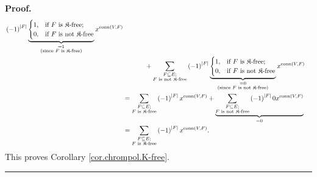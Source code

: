 \documentclass[numbers=enddot,12pt,final,onecolumn,notitlepage]{scrartcl}%
\theoremstyle{definition}
\newenvironment{proof}[1][Proof]{\noindent\textbf{#1.} }{\ \rule{0.5em}{0.5em}}
\newenvironment{verlong}{}{}
\let\sumnonlimits\sum
\renewcommand{\sum}{\sumnonlimits\limits}
\begin{document}
\begin{verlong}
\begin{proof}
\begin{align*}
{{}}\left(  -1\right)  ^{\left\vert F\right\vert }\underbrace{%
\begin{cases}
1, & \text{if }F\text{ is }\mathfrak{K}\text{-free;}\\
0, & \text{if }F\text{ is not }\mathfrak{K}\text{-free}%
\end{cases}
}_{\substack{=1\\\text{(since }F\text{ is }\mathfrak{K}\text{-free)}%
}}x^{\operatorname*{conn}\left(  V,F\right)  }\\
&  \ \ \ \ \ \ \ \ \ \ +\sum_{\substack{F\subseteq E;\\F\text{ is not
}\mathfrak{K}\text{-free}}}\left(  -1\right)  ^{\left\vert F\right\vert
}\underbrace{%
\begin{cases}
1, & \text{if }F\text{ is }\mathfrak{K}\text{-free;}\\
0, & \text{if }F\text{ is not }\mathfrak{K}\text{-free}%
\end{cases}
}_{\substack{=0\\\text{(since }F\text{ is not }\mathfrak{K}\text{-free)}%
}}x^{\operatorname*{conn}\left(  V,F\right)  }\\
&  =\sum_{\substack{F\subseteq E;\\F\text{ is }\mathfrak{K}\text{-free}%
}}\left(  -1\right)  ^{\left\vert F\right\vert }x^{\operatorname*{conn}\left(
V,F\right)  }+\underbrace{\sum_{\substack{F\subseteq E;\\F\text{ is not
}\mathfrak{K}\text{-free}}}\left(  -1\right)  ^{\left\vert F\right\vert
}0x^{\operatorname*{conn}\left(  V,F\right)  }}_{=0}\\
&  =\sum_{\substack{F\subseteq E;\\F\text{ is }\mathfrak{K}\text{-free}%
}}\left(  -1\right)  ^{\left\vert F\right\vert }x^{\operatorname*{conn}\left(
V,F\right)  }.
\end{align*}
This proves Corollary \ref{cor.chrompol.K-free}.
\end{proof}
\end{verlong}
\end{document}
